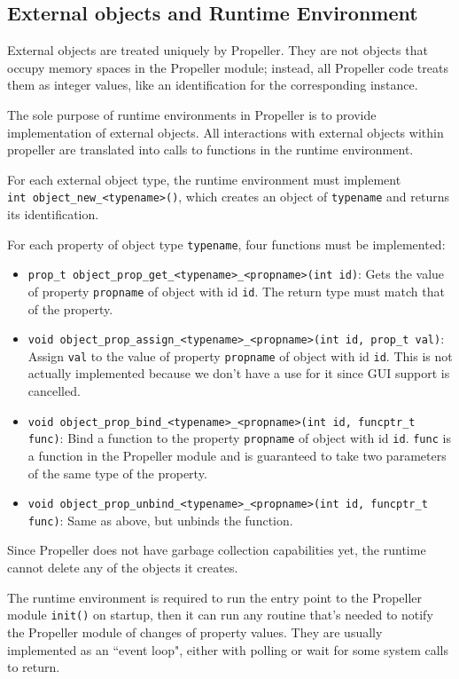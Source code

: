 \subsection{External objects and Runtime Environment}
External objects are treated uniquely by Propeller. They are
not objects that occupy memory spaces in the Propeller module; instead, all
Propeller code treats them as integer values, like an identification for the
corresponding instance.

The sole purpose of runtime environments in Propeller is to provide
implementation of external objects. All interactions with external objects
within propeller are translated into calls to functions in the runtime
environment.

For each external object type, the runtime environment must implement\\
\verb|int object_new_<typename>()|, which creates an object of \verb|typename|
and returns its identification.

For each property of object type \verb|typename|, four functions must be
implemented:
\begin{itemize}
\item \verb|prop_t object_prop_get_<typename>_<propname>(int id)|: Gets the
value of property \verb|propname| of object with id \verb|id|. The return type
must match that of the property.
\item \verb|void object_prop_assign_<typename>_<propname>(int id, prop_t val)|:
Assign \verb|val| to the value of property \verb|propname| of object with id
\verb|id|. This is not actually implemented because we don't have a use for it
since GUI support is cancelled.
\item \verb|void object_prop_bind_<typename>_<propname>(int id, funcptr_t func)|:
Bind a function to the property \verb|propname| of object with id \verb|id|.
\verb|func| is a function in the Propeller module and is guaranteed to take two
parameters of the same type of the property.
\item \verb|void object_prop_unbind_<typename>_<propname>(int id, funcptr_t func)|:
Same as above, but unbinds the function.
\end{itemize}

Since Propeller does not have garbage collection capabilities yet, the runtime
cannot delete any of the objects it creates.

The runtime environment is required to run the entry point to the Propeller module
\verb|init()| on startup, then it can run any routine that's needed to notify the
Propeller module of changes of property values. They are usually implemented as
an ``event loop", either with polling or wait for some system calls to return.

